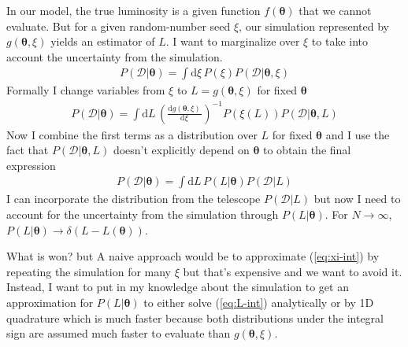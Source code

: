 \documentclass[a4,12pt]{article}
\newcommand{\data}{\ensuremath{\mathcal{D}}}
\newcommand{\given}[2]{\ensuremath{(#1 | #2)}}
\newcommand{\rmdx}[1]{\mbox{d} #1 \,} %
\renewcommand{\vec}[1]{\boldsymbol{#1}}
\newcommand{\vecth}{\ensuremath{{\vec{\theta}}}}
\def \refeq#1{(\ref{eq:#1})}
\begin{document}
In our model, the true luminosity is a given function $f(\vecth)$ that
we cannot evaluate. But for a given random-number seed $\xi$, our
simulation represented by $g(\vecth, \xi)$ yields an estimator of
$L$. I want to marginalize over $\xi$ to take into account the
uncertainty from the simulation.
\begin{align}
  \label{eq:xi-int}
  P\given{\data}{\vecth} = \int \rmdx{\xi}  P(\xi) P\given{\data}{\vecth, \xi}
\end{align}
Formally I change variables from $\xi$ to $L=g(\vecth, \xi)$ for fixed $\vecth$
\begin{align}
  P\given{\data}{\vecth} = \int \rmdx{L} \left(\frac{\rmdx{g(\vecth, \xi)}}{\rmdx{\xi}} \right)^{-1} P(\xi(L)) P\given{\data}{\vecth, L}
\end{align}
Now I combine the first terms as a distribution over $L$ for fixed
$\vecth$ and I use the fact that $P\given{\data}{\vecth, L}$ doesn't
explicitly depend on $\vecth$ to obtain the final expression
\begin{align}
  \label{eq:L-int}
  P\given{\data}{\vecth} = \int \rmdx{L} P(L| \vecth) P\given{\data}{L}
\end{align}
I can incorporate the distribution from the telescope
$P\given{\data}{L}$ but now I need to account for the uncertainty from
the simulation through $P(L|\vecth)$. For $N \to \infty$, $P(L| \vecth) \to \delta(L -
L(\vecth))$.

What is won?  but A naive approach would be to approximate
\refeq{xi-int} by repeating the simulation for many $\xi$ but that's
expensive and we want to avoid it. Instead, I want to put in my
knowledge about the simulation to get an approximation for $P(L|
\vecth)$ to either solve \refeq{L-int} analytically or by 1D
quadrature which is much faster because both distributions under the
integral sign are assumed much faster to evaluate than $g(\vecth,
\xi)$.
\end{document}
